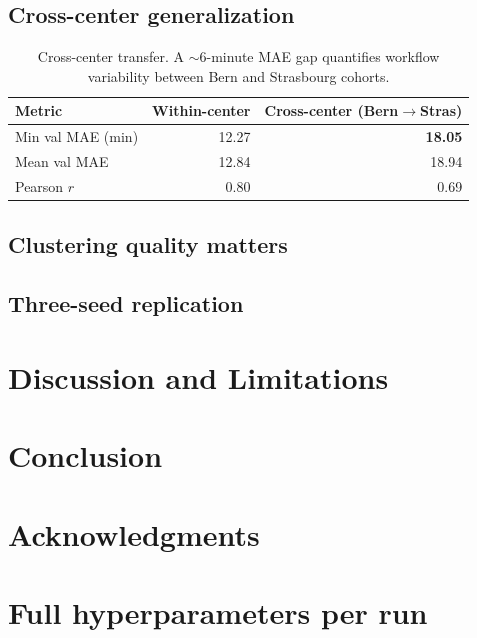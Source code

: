 \subsection{Cross-center generalization}
\begin{table}[t]
  \centering
  \caption{Cross-center transfer. A $\sim$6-minute MAE gap quantifies workflow variability
    between Bern and Strasbourg cohorts.}
  \label{tab:crosscenter}
  \begin{tabular}{lrr}
    \toprule
    Metric & Within-center & Cross-center (Bern$\to$Stras) \\
    \midrule
    Min val MAE (min) & 12.27 & \textbf{18.05} \\
    Mean val MAE     & 12.84 & 18.94 \\
    Pearson $r$      & 0.80 & 0.69 \\
    \bottomrule
  \end{tabular}
\end{table}

\subsection{Clustering quality matters}

\subsection{Three-seed replication}

\section{Discussion and Limitations}

\section{Conclusion}

\section*{Acknowledgments}

\small



\newpage
\appendix

\section{Full hyperparameters per run}
